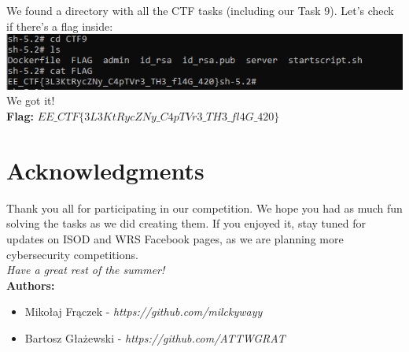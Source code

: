 \documentclass{article}
\begin{document}
We found a directory with all the CTF tasks (including our Task 9). Let’s check if there’s a flag inside:
\vspace{3mm} \\
\includegraphics[width=\textwidth]{"image98.png"}
We got it!
\vspace{3mm} \\
\textbf{Flag:} $ EE\_CTF\{3L3KtRycZNy\_C4pTVr3\_TH3\_fl4G\_420\} $

\section{Acknowledgments}
Thank you all for participating in our competition. We hope you had as much fun solving the tasks as we did creating them. If you enjoyed it, stay tuned for updates on ISOD and WRS Facebook pages, as we are planning more cybersecurity competitions.
\vspace{3mm} \\
\textit{Have a great rest of the summer!}
\vspace{3mm} \\
\textbf{Authors:}
\begin{itemize}
    \item Mikołaj Frączek - \textit{https://github.com/milckywayy}
    \item Bartosz Głażewski - \textit{https://github.com/ATTWGRAT}
\end{itemize}
\end{document}
